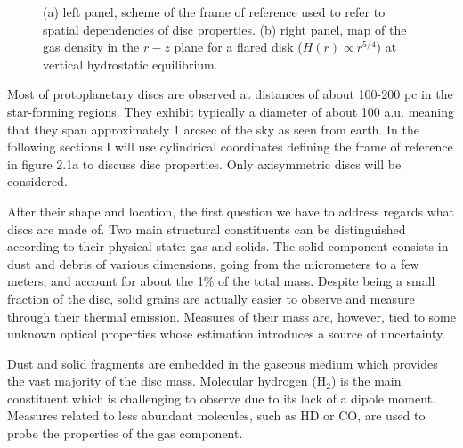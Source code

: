 \documentclass[a4paper,10pt]{report}
\begin{document}
\begin{figure}
\begin{center}
{}
    
    \end{center}
    \caption{(a) left panel, scheme of the frame of reference used to refer to
    spatial dependencies of disc properties. (b) right panel, map of the 
    gas density in the $r-z$ plane for a flared disk ($H(r) \propto r^{5/4}$) at vertical hydrostatic equilibrium.
}
\end{figure}

Most of protoplanetary discs are observed at distances of about 100-200 pc in the star-forming regions. 
They exhibit typically a diameter of about 100 a.u. meaning that they span approximately
1 arcsec of the sky as seen from earth.
In the following sections I will use cylindrical coordinates 
defining the frame of reference in figure 2.1a to discuss disc properties. Only axisymmetric discs will be considered.

After their shape and location, the first question we have to address regards what discs are made of.
Two main structural constituents can be distinguished according to their physical state: gas and solids.
The solid component consists in dust and debris of various dimensions, going from the micrometers to a few 
meters, and account for about the 1\% of the total mass. Despite being a small fraction of the disc, solid grains
are actually easier to observe and measure through their thermal emission. Measures of their mass are, however, tied to
some unknown optical properties whose estimation introduces a source of uncertainty.

Dust and solid fragments are embedded in the gaseous medium which provides the vast majority of the disc mass.
Molecular hydrogen (H$_2$) is the main constituent which is challenging to observe due to
its lack of a dipole moment. 
Measures related to less abundant molecules, such as HD or CO, are used to probe the properties of the gas component. 
\end{document}
